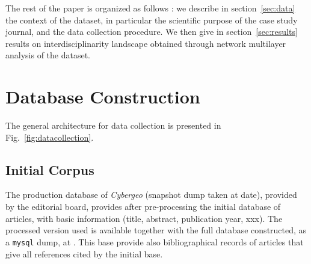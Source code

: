 


The rest of the paper is organized as follows : we describe in section~\ref{sec:data} the context of the dataset, in particular the scientific purpose of the case study journal, and the data collection procedure. We then give in section~\ref{sec:results} results on interdisciplinarity landscape obtained through network multilayer analysis of the dataset.










\section*{Database Construction}
\label{sec:data}



The general architecture for data collection is presented in Fig.~\ref{fig:datacollection}.


\subsection*{Initial Corpus}

The production database of \textit{Cybergeo} (snapshot dump taken at date), provided by the editorial board, provides after pre-processing the initial database of articles, with basic information (title, abstract, publication year, xxx). The processed version used is available together with the full database constructed, as a \texttt{mysql} dump, at \texttt{}. This base provide also bibliographical records of articles that give all references cited by the initial base.



